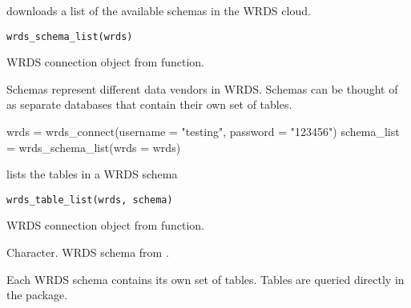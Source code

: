 \documentclass[a4paper]{book}
\begin{document}
%
\begin{Description}\relax
{} downloads a list of the available schemas in the WRDS cloud.
\end{Description}
%
\begin{Usage}
\begin{verbatim}
wrds_schema_list(wrds)
\end{verbatim}
\end{Usage}
%
\begin{Arguments}
\begin{ldescription}
\item[\code{wrds}] WRDS connection object from  function.
\end{ldescription}
\end{Arguments}
%
\begin{Details}\relax
Schemas represent different data vendors in WRDS. Schemas can be thought of as separate
databases that contain their own set of tables.
\end{Details}
%
\begin{Examples}
\begin{ExampleCode}
wrds = wrds_connect(username = "testing", password = "123456")
schema_list = wrds_schema_list(wrds = wrds)
\end{ExampleCode}
\end{Examples}
%
\begin{Description}\relax
{} lists the tables in a WRDS schema
\end{Description}
%
\begin{Usage}
\begin{verbatim}
wrds_table_list(wrds, schema)
\end{verbatim}
\end{Usage}
%
\begin{Arguments}
\begin{ldescription}
\item[\code{wrds}] WRDS connection object from  function.

\item[\code{schema}] Character. WRDS schema from .
\end{ldescription}
\end{Arguments}
%
\begin{Details}\relax
Each WRDS schema contains its own set of tables. Tables are queried directly in the package.
\end{Details}
\end{document}
